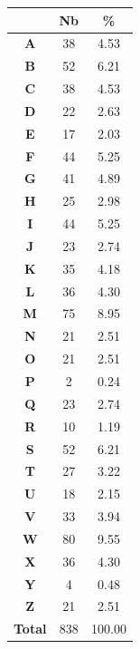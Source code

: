 \documentclass[a4paper, titlepage]{livret}
\begin{document}
\begin{minipage}[c]{.3\linewidth}
  \begin{tabular}{|c|c|c|}
    \hline
	& \textbf{Nb} & \textbf{\%}\\
	\hline
		\textbf{A} &      38 &  4.53\\
	\hline
	\textbf{B} &      52 &  6.21\\
	\hline
	\textbf{C} &      38 &  4.53\\
	\hline
	\textbf{D} &      22 &  2.63\\
	\hline
	\textbf{E} &      17 &  2.03\\
	\hline
	\textbf{F} &      44 &  5.25\\
	\hline
	\textbf{G} &      41 &  4.89\\
	\hline
	\textbf{H} &      25 &  2.98\\
	\hline
	\textbf{I} &      44 &  5.25\\
	\hline
	\textbf{J} &      23 &  2.74\\
	\hline
	\textbf{K} &      35 &  4.18\\
	\hline
	\textbf{L} &      36 &  4.30\\
	\hline
	\textbf{M} &      75 &  8.95\\
	\hline
	\textbf{N} &      21 &  2.51\\
	\hline
	\textbf{O} &      21 &  2.51\\
	\hline
	\textbf{P} &       2 &  0.24\\
	\hline
	\textbf{Q} &      23 &  2.74\\
	\hline
	\textbf{R} &      10 &  1.19\\
	\hline
	\textbf{S} &      52 &  6.21\\
	\hline
	\textbf{T} &      27 &  3.22\\
	\hline
	\textbf{U} &      18 &  2.15\\
	\hline
	\textbf{V} &      33 &  3.94\\
	\hline
	\textbf{W} &      80 &  9.55\\
	\hline
	\textbf{X} &      36 &  4.30\\
	\hline
	\textbf{Y} &       4 &  0.48\\
	\hline
	\textbf{Z} &      21 &  2.51\\
	\hline
	\textbf{Total} &     838 &  100.00\\
	\hline
  \end{tabular}
  \label{tab11}
  \end{minipage}
\end{document}
